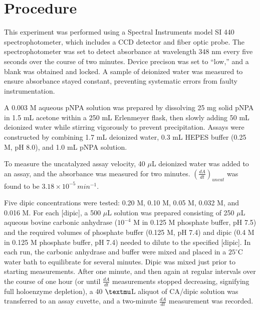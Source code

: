 \section{Procedure}
This experiment was performed using a Spectral Instruments model SI 440 spectrophotometer, which includes a CCD detector and fiber optic probe. The spectrophotometer was set to detect absorbance at wavelength 348 nm every five seconds over the course of two minutes. Device precison was set to ``low,'' and a blank was obtained and locked. A sample of deionized water was measured to ensure absorbance stayed constant, preventing systematic errors from faulty instrumentation.

A 0.003 M aqueous pNPA solution was prepared by dissolving 25 mg solid pNPA in 1.5 mL acetone within a 250 mL Erlenmeyer flask, then slowly adding 50 mL deionized water while stirring vigorously to prevent precipitation. Assays were constructed by combining 1.7 mL deionized water, 0.3 mL HEPES buffer (0.25 M, pH 8.0), and 1.0 mL pNPA solution.

To measure the uncatalyzed assay velocity, 40 $\mu$L deionized water was added to an assay, and the absorbance was measured for two minutes. $\left( \frac{dA}{dt} \right)_{uncat}$ was found to be $3.18\times10^{-5}\ min^{-1}$.

Five dipic concentrations were tested: 0.20 M, 0.10 M, 0.05 M, 0.032 M, and 0.016 M. For each [dipic], a 500 $\mu$L solution was prepared consisting of 250 $\mu$L aqueous bovine carbonic anhydrase ($10^{-4}$ M in 0.125 M phosphate buffer, pH 7.5) and the required volumes of phosphate buffer (0.125 M, pH 7.4) and dipic (0.4 M in 0.125 M phosphate buffer, pH 7.4) needed to dilute to the specified [dipic]. In each run, the carbonic anhydrase and buffer were mixed and placed in a $25^{\circ}$C water bath to equilibrate for several minutes. Dipic was mixed just prior to starting measurements. After one minute, and then again at regular intervals over the course of one hour (or until $\frac{dA}{dt}$ measurements stopped decreasing, signifying full holoenzyme depletion), a 40 $\textmu$L aliquot of CA/dipic solution was transferred to an assay cuvette, and a two-minute $\frac{dA}{dt}$ measurement was recorded. 